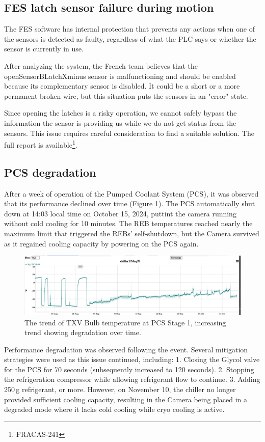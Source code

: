 \subsection{FES latch sensor failure during motion}
The FES software has internal protection that prevents any actions when one of the sensors is detected as faulty, regardless of what the PLC says or whether the sensor is currently in use.

After analyzing the system, the French team believes that the openSensorBLatchXminus sensor is malfunctioning and should be enabled because its complementary sensor is disabled. It could be a short or a more permanent broken wire, but this situation puts the sensors in an "error" state.

Since opening the latches is a risky operation, we cannot safely bypass the information the sensor is providing us while we do not get status from the sensors. This issue requires careful consideration to find a suitable solution.
The full report is available\footnote{FRACAS-241}.

\subsection{PCS degradation}
After a week of operation of the Pumped Coolant System (PCS), it was observed that its performance declined over time (Figure \ref{fig:pcsdegradation}). The PCS automatically shut down at 14:03 local time on October 15, 2024, puttint the camera running without cold cooling for 10 minutes. The REB temperatures reached nearly the maximum limit that triggered the REBs' self-shutdown, but the Camera survived as it regained cooling capacity by powering on the PCS again.
\begin{figure}
    \centering
    \includegraphics[width=1\linewidth]{figures//Issues/PCSTXVBulbAug11toOct17.png}
    \caption{The trend of TXV Bulb temperature at PCS Stage 1, increasing trend showing degradation over time.}
    \label{fig:pcsdegradation}
\end{figure}

Performance degradation was observed following the event. Several mitigation strategies were used as this issue continued, including:
1. Closing the Glycol valve for the PCS for 70 seconds (subsequently increased to 120 seconds).
2. Stopping the refrigeration compressor while allowing refrigerant flow to continue.
3. Adding 250\,g refrigerant, or more.
However, on November 10, the chiller no longer provided sufficient cooling capacity, resulting in the Camera being placed in a degraded mode where it lacks cold cooling while cryo cooling is active.

